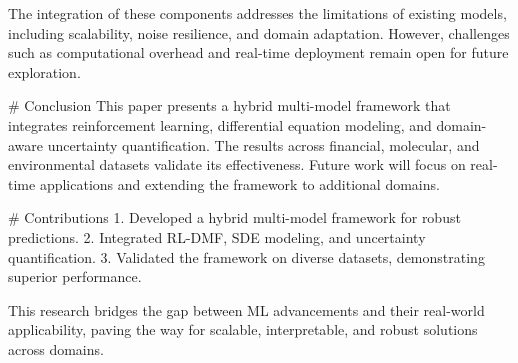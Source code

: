 The integration of these components addresses the limitations of existing models, including scalability, noise resilience, and domain adaptation. However, challenges such as computational overhead and real-time deployment remain open for future exploration.

# Conclusion
This paper presents a hybrid multi-model framework that integrates reinforcement learning, differential equation modeling, and domain-aware uncertainty quantification. The results across financial, molecular, and environmental datasets validate its effectiveness. Future work will focus on real-time applications and extending the framework to additional domains.

# Contributions
1. Developed a hybrid multi-model framework for robust predictions.
2. Integrated RL-DMF, SDE modeling, and uncertainty quantification.
3. Validated the framework on diverse datasets, demonstrating superior performance.

This research bridges the gap between ML advancements and their real-world applicability, paving the way for scalable, interpretable, and robust solutions across domains.